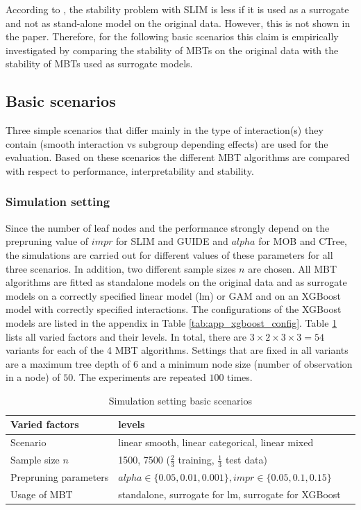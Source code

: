According to \citep{Hu.2020}, the stability problem with SLIM is less if it is used as a surrogate and not as stand-alone model on the original data. However, this is not shown in the paper. Therefore, for the following basic scenarios this claim is empirically investigated by comparing the stability of MBTs on the original data with the stability of MBTs used as surrogate models.





\subsection{Basic scenarios}
Three simple scenarios that differ mainly in the type of interaction(s) they contain (smooth interaction vs subgroup depending effects) are used for the evaluation. Based on these scenarios the different MBT algorithms are compared with respect to performance, interpretability and stability.



\subsubsection{Simulation setting}
Since the number of leaf nodes and the performance strongly depend on the prepruning value of $impr$ for SLIM and GUIDE and $alpha$ for MOB and CTree, the simulations are carried out for different values of these parameters for all three scenarios. In addition, two different sample sizes $n$ are chosen. 
All MBT algorithms are fitted as standalone models on the original data and as surrogate models on a correctly specified linear model (lm) or GAM and on an XGBoost model with correctly specified interactions. The configurations of the XGBoost models are listed in the appendix in Table \ref{tab:app_xgboost_config}.
Table \ref{tab:simulation_setting} lists all varied factors and their levels. In total, there are $3 \times 2 \times 3 \times 3 = 54$ variants for each of the 4 MBT algorithms.
Settings that are fixed in all variants are a  maximum tree depth of $6$ and a minimum node size (number of observation in a node) of $50$.
The experiments are repeated $100$ times.

\begin{table}[!htb] 
\centering \small
\begin{tabular}[t]{lll}
\hline
Varied factors & levels \\
\hline
Scenario  & linear smooth, linear categorical, linear mixed\\
Sample size $n$  & 1500, 7500 ($\frac{2}{3}$  training, $\frac{1}{3}$ test data)\\
Prepruning parameters   & $alpha \in \{0.05,0.01,0.001\}, impr \in \{0.05,0.1,0.15\}$ \\
Usage of MBT  & standalone, surrogate for lm, surrogate for XGBoost \\ 
\hline
\end{tabular}
\caption{Simulation setting basic scenarios}
\label{tab:simulation_setting}
\end{table}


